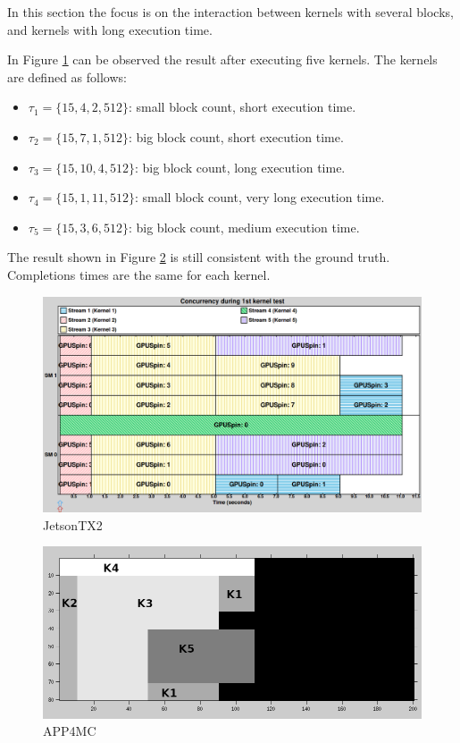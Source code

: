 \documentclass[
  12pt,
  a4paperpaper,
]{report}
\providecommand{\tightlist}{%
  \setlength{\itemsep}{0pt}\setlength{\parskip}{0pt}}
\begin{document}
In this section the focus is on the interaction between kernels with several blocks, and kernels with long execution time.

In Figure \ref{img:nvidia-ex06} can be observed the result after
executing five kernels. The kernels are defined as follows:

\begin{itemize}
\tightlist
\item
  \(\tau_1 = \{15,4,2,512\}\): small block count, short execution time.
\item
  \(\tau_2 = \{15, 7,1,512\}\): big block count, short execution time.
\item
  \(\tau_3 = \{15,10,4,512\}\): big block count, long execution time.
\item
  \(\tau_4 =\{ 15, 1,11,512\}\): small block count, very long execution
  time.
\item
  \(\tau_5 = \{15,3,6,512\}\): big block count, medium execution time.
\end{itemize}

The result shown in Figure \ref{img:octave-ex06} is still consistent
with the ground truth. Completions times are the same for each kernel.

\begin{figure}
\centering
\includegraphics[width=1\textwidth,height=\textheight]{source/figures/nvidia/ex06.png}
\caption{JetsonTX2 \label{img:nvidia-ex06}}
\end{figure}

\begin{figure}
\centering
\includegraphics[width=1\textwidth,height=\textheight]{source/figures/octave/ex06.png}
\caption{APP4MC \label{img:octave-ex06}}
\end{figure}
\end{document}
